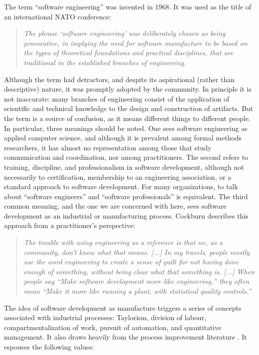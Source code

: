 The term ``software engineering'' was invented in 1968. It was used as the title of an international NATO conference:

\begin{quote} 
\emph{The phrase `software engineering' was deliberately chosen as being provocative, in implying the need for software manufacture to be based on the types of theoretical foundations and practical disciplines, that are traditional in the established branches of engineering.} \cite{Naur1969}
\end{quote}

Although the term had detractors, and despite its aspirational (rather than descriptive) nature, it was promptly adopted by the community. In principle it is not inaccurate: many branches of engineering consist of the application of scientific and technical knowledge to the design and construction of artifacts. But the term is a source of confusion, as it means different things to different people. In particular, three meanings should be noted. One sees software engineering as applied computer science, and although it is prevalent among formal methods researchers, it has almost no representation among those that study communication and coordination, nor among practitioners. The second refers to training, discipline, and professionalism in software development, although not necessarily to certification, membership to an engineering association, or a standard approach to software development. For many organizations, to talk about ``software engineers'' and ``software professionals'' is equivalent. The third common meaning, and the one we are concerned with here, sees software development as an industrial or manufacturing process. Cockburn describes this approach from a practitioner's perspective:

\begin{quote}
\emph{The trouble with using engineering as a reference is that we, as a community, don't know what that means. [...] In my travels, people mostly use the word \emph{engineering} to create a sense of guilt for not having done enough of something, without being clear what that something is. [...] When people say ``Make software development more like engineering,'' they often mean ``Make it more like running a plant, with statistical quality controls.''} \cite{Cockburn2001}
\end{quote}

The idea of software development as manufacture triggers a series of concepts associated with industrial processes: Taylorism, division of labour, compartmentalization of work, pursuit of automation, and quantitative management. It also draws heavily from the process improvement literature \cite{Deming1986}. It espouses the following values:

